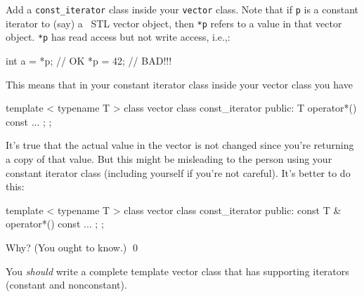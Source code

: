 \newpage
\begin{ex}
Add a \verb!const_iterator! class inside your
\verb!vector! class.
Note that if \verb!p! is a constant iterator to (say)
a \cpp\ STL vector object, then
\verb!*p! refers to a value in that vector object.
\verb!*p! has read access but not write access, i.e.,:
\begin{console}[frame=single]
int a = *p; // OK
*p = 42;    // BAD!!!
\end{console}
This means that in your constant iterator class inside your vector class
you have
\begin{console}[frame=single,fontsize=\footnotesize]
template < typename T >
class vector
{
    class const_iterator
    {
    public:
        T operator*() const
        { ... }
    };
};
\end{console}
It's true that the actual value in the vector is not changed since
you're returning a copy of that value.
But this might be misleading to the person using your constant iterator class
(including yourself if you're not careful).
It's better to do this:
\begin{console}[frame=single,fontsize=\footnotesize]
template < typename T >
class vector
{
    class const_iterator
    {
    public:
        const T & operator*() const
        { ... }
    };
};
\end{console}
Why? (You ought to know.)
\qed
\end{ex}

You \textit{should} write a complete
template vector class that has supporting
iterators (constant and nonconstant).
